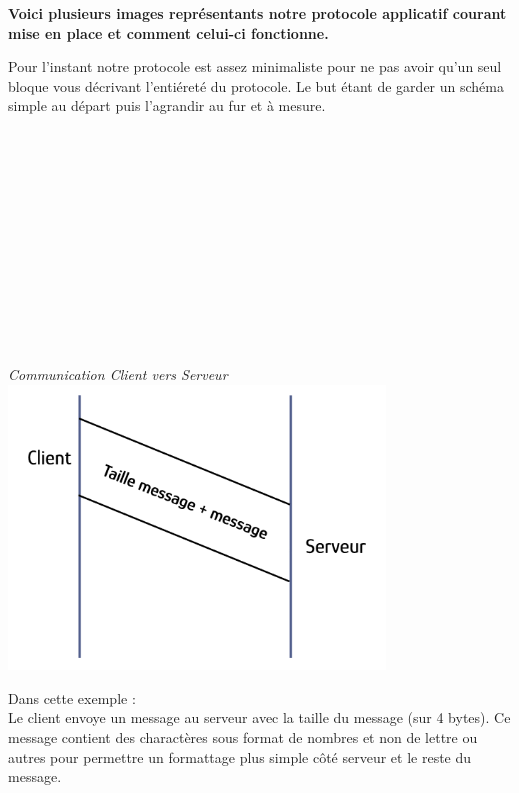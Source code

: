  \textbf{Voici plusieurs images représentants notre protocole applicatif courant mise en place et comment celui-ci fonctionne.} \\ \par

Pour l'instant notre protocole est assez minimaliste pour ne pas avoir qu'un seul bloque vous décrivant l'entiéreté du protocole. Le but étant de garder un schéma simple au départ puis l'agrandir au fur et à mesure. \\ \\ \\ \\ \\ \\ \\ \\ \\ \\ \\ \\ \\ \par


    {
    \centering
    \textit{Communication Client vers Serveur} \\
    \includegraphics[width=10cm]{figures/cl_serv.png}
    \par
    }
Dans cette exemple :\\ 
    \tab[2cm] Le client envoye un message au serveur avec la taille du message (sur 4 bytes). Ce message contient des charactères sous format de nombres et non de lettre ou autres pour permettre un formattage plus simple côté serveur et le reste du message. \\ \par {}\\ \par


